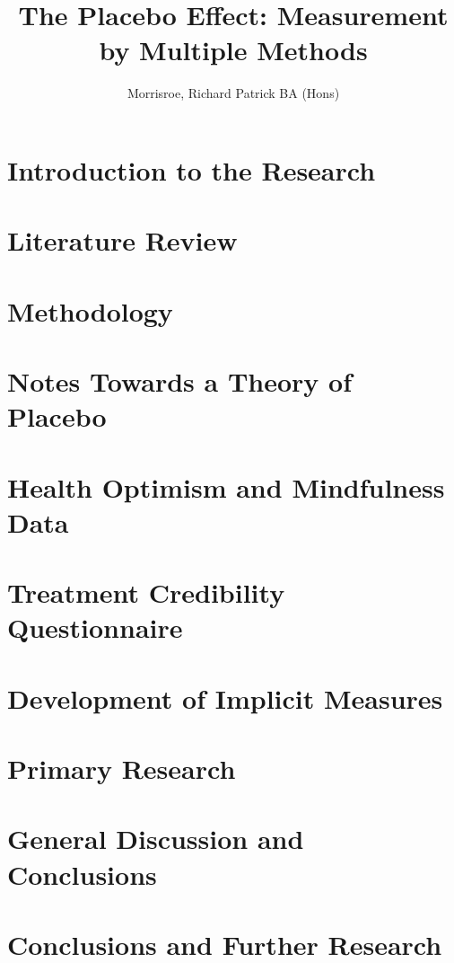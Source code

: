 \documentclass[apsych, phd]{uccthesis}
\title{The Placebo Effect: Measurement by Multiple Methods}
\author{Morrisroe, Richard Patrick BA (Hons)}
\begin{document}
\maketitle


\tableofcontents

\chapter{Introduction to the Research}
\label{cha:intr-rese}


\chapter{Literature Review}
\label{cha:literature-review}


\chapter{Methodology}
\label{cha:methodology}



\chapter{Notes Towards a Theory of Placebo}
\label{cha:notes-towards-theory}




\chapter{Health Optimism and Mindfulness Data}
\label{cha:health-for-thesis}

\chapter{Treatment Credibility Questionnaire}
\label{cha:tcq-thesis}


\chapter{Development of Implicit Measures}
\label{cha:devel-impl-meas}


\chapter{Primary Research}
\label{cha:primary-research}
\label{cha:primary-research-1}


\label{cha:primary-research-2}
\chapter{General Discussion and Conclusions}
\label{cha:general-discussion}
\chapter{Conclusions and Further Research}
\label{cha:concl-furth-rese}


\end{document}
